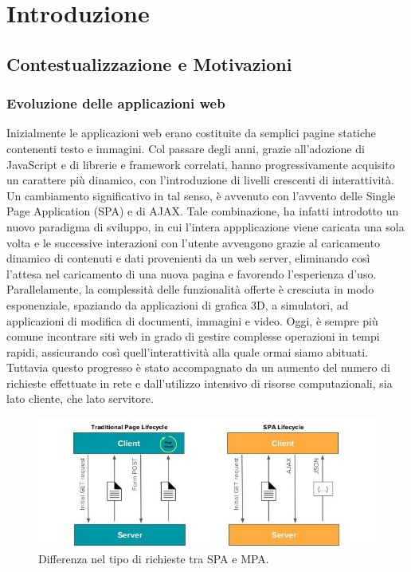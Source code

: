 \chapter{Introduzione}
\label{chap:1}



\section{Contestualizzazione e Motivazioni}
\label{sec:Contestualizzazione}

\subsection{Evoluzione delle applicazioni web}
Inizialmente le applicazioni web erano costituite da semplici pagine statiche contenenti testo e immagini.
Col passare degli anni, grazie all'adozione di JavaScript e di librerie e framework correlati, hanno progressivamente acquisito un carattere più dinamico, con l'introduzione di livelli crescenti di interattività. 
Un cambiamento significativo in tal senso, è avvenuto con l'avvento delle Single Page Application (SPA) e di AJAX.
Tale combinazione, ha infatti introdotto un nuovo paradigma di sviluppo, in cui l'intera appplicazione viene caricata una sola volta e le successive interazioni con l'utente avvengono grazie al caricamento dinamico di contenuti e dati provenienti da un web server, eliminando così l'attesa nel caricamento di una nuova pagina e favorendo l'esperienza d'uso.
\\Parallelamente, la complessità delle funzionalità offerte è cresciuta in modo esponenziale, spaziando da applicazioni di grafica 3D, a simulatori, ad applicazioni di modifica di documenti, immagini e video.
Oggi, è sempre più comune incontrare siti web in grado di gestire complesse operazioni in tempi rapidi, assicurando così quell'interattività alla quale ormai siamo abituati. 
Tuttavia questo progresso è stato accompagnato da un aumento del numero di richieste effettuate in rete e dall'utilizzo intensivo di risorse computazionali, sia lato cliente, che lato servitore.
\begin{figure}
        \begin{center}
                \includegraphics[width=0.61\columnwidth]{images/spa.jpg}
        \end{center}
        \caption{Differenza nel tipo di richieste tra SPA e MPA.}
        \label{fig:spa}
\end{figure}
        
